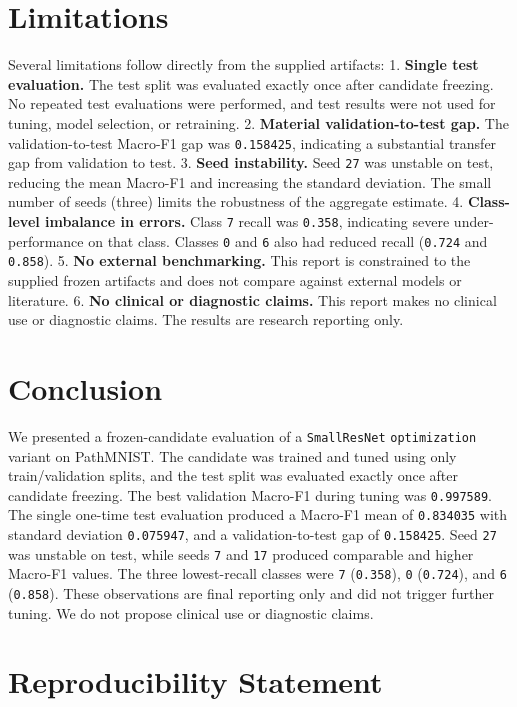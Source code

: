 \documentclass[10pt]{article}
\begin{document}
\section{Limitations}
Several limitations follow directly from the supplied artifacts:
1. \textbf{Single test evaluation.} The test split was evaluated exactly once after candidate freezing. No repeated test evaluations were performed, and test results were not used for tuning, model selection, or retraining.
2. \textbf{Material validation-to-test gap.} The validation-to-test Macro-F1 gap was \texttt{0.158425}, indicating a substantial transfer gap from validation to test.
3. \textbf{Seed instability.} Seed \texttt{27} was unstable on test, reducing the mean Macro-F1 and increasing the standard deviation. The small number of seeds (three) limits the robustness of the aggregate estimate.
4. \textbf{Class-level imbalance in errors.} Class \texttt{7} recall was \texttt{0.358}, indicating severe under-performance on that class. Classes \texttt{0} and \texttt{6} also had reduced recall (\texttt{0.724} and \texttt{0.858}).
5. \textbf{No external benchmarking.} This report is constrained to the supplied frozen artifacts and does not compare against external models or literature.
6. \textbf{No clinical or diagnostic claims.} This report makes no clinical use or diagnostic claims. The results are research reporting only.
\section{Conclusion}
We presented a frozen-candidate evaluation of a \texttt{SmallResNet} \texttt{optimization} variant on PathMNIST. The candidate was trained and tuned using only train/validation splits, and the test split was evaluated exactly once after candidate freezing. The best validation Macro-F1 during tuning was \texttt{0.997589}. The single one-time test evaluation produced a Macro-F1 mean of \texttt{0.834035} with standard deviation \texttt{0.075947}, and a validation-to-test gap of \texttt{0.158425}. Seed \texttt{27} was unstable on test, while seeds \texttt{7} and \texttt{17} produced comparable and higher Macro-F1 values. The three lowest-recall classes were \texttt{7} (\texttt{0.358}), \texttt{0} (\texttt{0.724}), and \texttt{6} (\texttt{0.858}). These observations are final reporting only and did not trigger further tuning. We do not propose clinical use or diagnostic claims.
\section{Reproducibility Statement}
\end{document}
